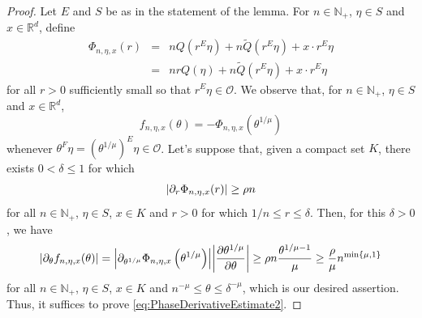 \documentclass[11pt]{article}
\theoremstyle{remark}
\newcommand{\p}{\partial}
\newcommand{\f}[2]{\frac{#1}{#2}}
\begin{document}
\begin{proof}
Let $E$ and $S$ be as in the statement of the lemma. For $n\in\mathbb{N}_+$, $\eta\in S$ and $x\in \mathbb{R}^d$, define
\begin{eqnarray*}
\Phi_{n,\eta,x}(r)&=&nQ(r^E\eta)+n\widetilde{Q}(r^E\eta)+x\cdot r^E\eta\\
&=&nrQ(\eta)+n\widetilde{Q}(r^E\eta)+x\cdot r^E\eta
\end{eqnarray*}
for all $r>0$ sufficiently small so that $r^E\eta\in \mathcal{O}$.  We observe that, for $n\in\mathbb{N}_+$, $\eta\in S$ and $x\in\mathbb{R}^d$, 
\begin{equation*}
f_{n,\eta,x}(\theta)=-\Phi_{n,\eta,x}\left(\theta^{1/\mu}\right)
\end{equation*}
whenever $\theta^F\eta=(\theta^{1/\mu})^E\eta\in \mathcal{O}$. Let's suppose that, given a compact set $K$, there exists $0<\delta\leq 1$ for which
\begin{equation}\label{eq:PhaseDerivativeEstimate2}
\abs{\partial_r \Phi_{n,\eta,x}(r)}\geq\rho n
\end{equation}
for all $n\in\mathbb{N}_+$, $\eta\in S$, $x\in K$ and $r>0$ for which $1/n\leq r\leq \delta$. Then, for this $\delta>0$, we have
\begin{equation*}
    \abs{\p_\theta f_{n,\eta,x} (\theta)} = 
     \abs{  \p_{\theta^{1/\mu}} \Phi_{n,\eta,x}\left(\theta^{1/\mu}\right)}
     \abs{ \f{\p \theta^{1/\mu}}{\p \theta}} 
     \geq 
    \rho n\f{\theta^{1/\mu - 1}  }{\mu}  \geq \f{\rho}{\mu}n^{\min\{\mu,1 \}}
\end{equation*}
for all $n\in\mathbb{N}_+$, $\eta\in S$, $x\in K$ and $n^{-\mu}\leq \theta\leq \delta^{-\mu}$, which is our desired assertion. Thus, it suffices to prove \eqref{eq:PhaseDerivativeEstimate2}.



\end{proof}
\end{document}
